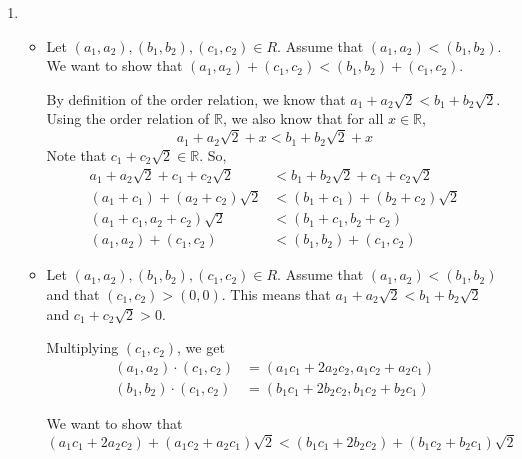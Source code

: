 \documentclass[12pt]{article}
\begin{document}
\begin{enumerate}[start=1,label={\bfseries Problem \arabic*:},leftmargin=1in]
\begin{enumerate}
        \item 
            \begin{itemize}
                \item Let $(a_{1}, a_{2}), (b_{1}, b_{2}), (c_{1}, c_{2}) \in R$. Assume that $(a_{1}, a_{2}) < (b_{1}, b_{2})$. We want to show that $(a_{1}, a_{2}) + (c_{1}, c_{2}) < (b_{1}, b_{2}) + (c_{1}, c_{2})$. 
                
                By definition of the order relation, we know that $a_{1} + a_{2} \sqrt{2} < b_{1} + b_{2} \sqrt{2}$. 
                Using the order relation of $\mathbb{R}$, we also know that for all $x \in \mathbb{R}$, 
                \[ 
                a_{1} + a_{2} \sqrt{2} + x< b_{1} + b_{2} \sqrt{2} + x
                \]
                Note that $c_{1} + c_{2}\sqrt{2} \in \mathbb{R}$. So, 
                \begin{align*}
                    a_{1} + a_{2} \sqrt{2} + c_{1} + c_{2}\sqrt{2} &< b_{1} + b_{2} \sqrt{2} + c_{1} + c_{2}\sqrt{2}\\ 
                    (a_{1} + c_{1}) + (a_{2} + c_{2}) \sqrt{2} &< (b_{1} + c_{1}) + (b_{2} + c_{2}) \sqrt{2}\\ 
                    (a_{1} + c_{1}, a_{2} + c_{2}) \sqrt{2} &< (b_{1} + c_{1}, b_{2} + c_{2}) \\ 
                    (a_{1}, a_{2}) + (c_{1}, c_{2}) &< (b_{1}, b_{2}) + (c_{1}, c_{2})
                \end{align*}
                    

                \item Let $(a_{1}, a_{2}), (b_{1}, b_{2}), (c_{1}, c_{2}) \in R$. Assume that $(a_{1}, a_{2}) < (b_{1}, b_{2})$ and that $(c_{1}, c_{2}) > (0, 0)$.
                This means that $a_{1} + a_{2}\sqrt{2} < b_{1} + b_{2}\sqrt{2}$ and $c_{1} + c_{2}\sqrt{2} > 0$. 
                
                Multiplying $(c_{1}, c_{2})$, we get 
                \begin{align*}
                    (a_{1}, a_{2}) \cdot (c_{1}, c_{2}) &= (a_{1}c_{1} + 2a_{2}c_{2}, a_{1}c_{2} + a_{2}c_{1})\\ 
                    (b_{1}, b_{2}) \cdot (c_{1}, c_{2}) &= (b_{1}c_{1} + 2b_{2}c_{2}, b_{1}c_{2} + b_{2}c_{1})
                \end{align*}

                We want to show that 
                \[
                    (a_{1}c_{1} + 2a_{2}c_{2}) + (a_{1}c_{2} + a_{2}c_{1})\sqrt{2} < (b_{1}c_{1} + 2b_{2}c_{2}) + (b_{1}c_{2} + b_{2}c_{1})\sqrt{2}
                \]


\end{itemize}
\end{enumerate}
\end{enumerate}
\end{document}
